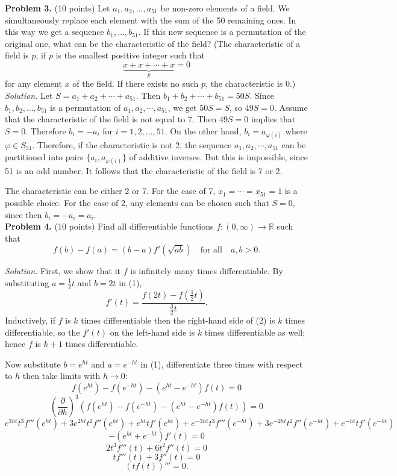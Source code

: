 \documentclass{article}
\begin{document}
\textbf{Problem 3.} (10 points)
Let $a_1, a_2, \ldots, a_{51}$ be non-zero elements of a field. We simultaneously replace each element with the sum of the 50 remaining ones. In this way we get a sequence $b_1, \ldots, b_{51}$. If this new sequence is a permutation of the original one, what can be the characteristic of the field? (The characteristic of a field is $p$, if $p$ is the smallest positive integer such that
\[
\underbrace{x + x + \cdots + x}_{p} = 0
\]
for any element $x$ of the field. If there exists no such $p$, the characteristic is 0.) \\

\textit{Solution.} Let $S = a_1 + a_2 + \cdots + a_{51}$. Then $b_1 + b_2 + \cdots + b_{51} = 50S$. Since $b_1, b_2, \ldots, b_{51}$ is a permutation of $a_1, a_2, \cdots, a_{51}$, we get $50S = S$, so $49S = 0$. Assume that the characteristic of the field is not equal to 7. Then $49S = 0$ implies that $S = 0$. Therefore $b_i = -a_i$ for $i = 1, 2, \ldots, 51$. On the other hand, $b_i = a_{\varphi(i)}$ where $\varphi \in S_{51}$. Therefore, if the characteristic is not 2, the sequence $a_1, a_2, \cdots, a_{51}$ can be partitioned into pairs $\{a_i, a_{\varphi(i)}\}$ of additive inverses. But this is impossible, since 51 is an odd number. It follows that the characteristic of the field is 7 or 2.

The characteristic can be either 2 or 7. For the case of 7, $x_1 = \cdots = x_{51} = 1$ is a possible choice. For the case of 2, any elements can be chosen such that $S = 0$, since then $b_i = -a_i = a_i$. \\

\textbf{Problem 4.} (10 points)
Find all differentiable functions $f : (0, \infty) \to \mathbb{R}$ such that
\[
f(b) - f(a) = (b - a) f'\left( \sqrt{ab} \right) \quad \text{for all} \quad a, b > 0. \tag{1}
\]

\textit{Solution.} First, we show that it $f$ is infinitely many times differentiable.
By substituting $a = \frac{1}{2}t$ and $b = 2t$ in (1),
\[
f'(t) = \frac{f(2t) - f\left(\frac{1}{2}t\right)}{\frac{3}{2}t}. \tag{2}
\]
Inductively, if $f$ is $k$ times differentiable
then the right-hand side of (2) is $k$ times differentiable, so the $f'(t)$ on the left-hand side is $k$ times differentiable as well; hence $f$ is $k + 1$ times differentiable.

Now substitute $b = e^{ht}$ and $a = e^{-ht}$ in (1), differentiate three times with respect to $h$ then take limits with $h \to 0$:
\[
f(e^{ht}) - f(e^{-ht}) - (e^{ht} - e^{-ht})f(t) = 0
\]
\[
\left( \frac{\partial}{\partial h} \right)^3 \left( f(e^{ht}) - f(e^{-ht}) - (e^{ht} - e^{-ht})f(t) \right) = 0
\]
\[
e^{3ht} t^3 f'''(e^{ht}) + 3e^{2ht} t^2 f''(e^{ht}) + e^{ht} t f'(e^{ht}) + e^{-3ht} t^3 f'''(e^{-ht}) + 3e^{-2ht} t^2 f''(e^{-ht}) + e^{-ht} t f'(e^{-ht})
\]
\[
- (e^{ht} + e^{-ht}) f'(t) = 0
\]
\[
2t^3 f'''(t) + 6t^2 f''(t) = 0
\]
\[
t f'''(t) + 3 f''(t) = 0
\]
\[
(t f(t))''' = 0.
\]
\end{document}
